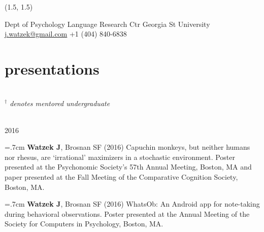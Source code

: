 \documentclass[]{friggeri-cv}
\begin{document}
\renewenvironment{aside}{%
  \let\oldsection\section
  \renewcommand{\section}[1]{
    \par\vspace{\baselineskip}{\Large\headingfont\color{headercolor} ##1}
  }
  \begin{textblock}{3.6}(1.5, 1.5)
  \begin{flushright}
  \obeycr
}{%
  \restorecr
  \end{flushright}
  \end{textblock}
  \let\section\oldsection
}


\begin{aside}
  \section{{\normalfont julia}watzek}
    Dept of Psychology
    Language Research Ctr
    Georgia St University
    ~
    \href{mailto:j.watzek@gmail.com}{j.watzek@gmail.com}
    +1 (404) 840-6838
\end{aside}


\section{presentations} ~\\[-1.3cm]

\hspace{.35cm} {\small{} \emph{${}^\dagger$ denotes mentored undergraduate}}

{\large{} ~\\[-.15cm] 2016}

\hangindent=.7cm \textbf{Watzek J}, Brosnan SF (2016) Capuchin monkeys, but neither humans nor rhesus, are `irrational' maximizers in a stochastic environment. Poster presented at the Psychonomic Society's 57th Annual Meeting, Boston, MA and paper presented at the Fall Meeting of the Comparative Cognition Society, Boston, MA.

\hangindent=.7cm \textbf{Watzek J}, Brosnan SF (2016) WhatsOb: An Android app for note-taking during behavioral observations. Poster presented at the Annual Meeting of the Society for Computers in Psychology, Boston, MA.
\end{document}
